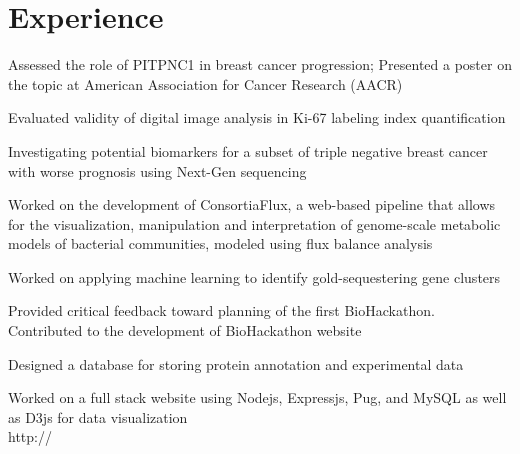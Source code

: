 \documentclass[]{deedy-resume-openfont}
\begin{document}
\begin{minipage}[t]{0.66\textwidth}


\section{Experience}
\vspace{\topsep} %
\begin{tightemize}
\item \href{https://github.com/tt6746690/courseProjects/blob/master/ROP299/manuscript/manuscript.pdf
}{} Assessed the role of PITPNC1 in breast cancer progression; Presented a poster on the topic at American Association for Cancer Research (AACR)
\item \href{https://github.com/tt6746690/courseProjects/blob/master/DONEsummer2016/ki67Paper/manuscript/template.pdf
}{} Evaluated validity of digital image analysis in Ki-67 labeling index quantification
\item Investigating potential biomarkers for a subset of triple negative breast cancer with worse prognosis using Next-Gen sequencing
\end{tightemize}
\sectionsep

\begin{tightemize}
\item Worked on the development of ConsortiaFlux, a web-based pipeline that allows for the visualization, manipulation and interpretation of genome-scale metabolic models of bacterial communities, modeled using flux balance analysis
\item Worked on applying machine learning to identify gold-sequestering gene clusters
\item Provided critical feedback toward planning of the first BioHackathon. Contributed to the development of BioHackathon website
\end{tightemize}
\sectionsep

\begin{tightemize}
\item Designed a database for storing protein annotation and experimental data
\item Worked on a full stack website using Nodejs, Expressjs, Pug, and MySQL as well as D3js for data visualization \\ http:// \href{159.203.47.10}{}
\end{tightemize}
\sectionsep



\end{minipage}
\end{document}
